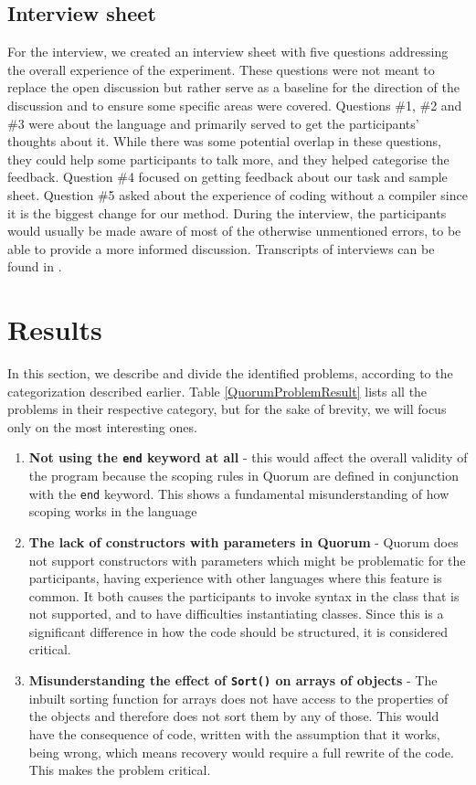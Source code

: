 \documentclass[preprint,10pt]{sigplanconf}
\begin{document}
\subsection{Interview sheet}
For the interview, we created an interview sheet with five questions addressing the overall experience of the experiment.
These questions were not meant to replace the open discussion but rather serve as a baseline for the direction of the discussion and to ensure some specific areas were covered.
Questions \#1, \#2 and \#3 were about the language and primarily served to get the participants' thoughts about it.
While there was some potential overlap in these questions, they could help some participants to talk more, and they helped categorise the feedback.
Question \#4 focused on getting feedback about our task and sample sheet.
Question \#5 asked about the experience of coding without a compiler since it is the biggest change for our method.
During the interview, the participants would usually be made aware of most of the otherwise unmentioned errors, to be able to provide a more informed discussion.
Transcripts of interviews can be found in \cite{thesis}.

\section{Results}
In this section, we describe and divide the identified problems, according to the categorization described earlier. Table \ref{QuorumProblemResult} lists all the problems in their respective category, but for the sake of brevity, we will focus only on the most interesting ones. 

\begin{enumerate}
\item \textbf{Not using the \lstinline!end! keyword at all} - this would affect the overall validity of the program because the scoping rules in Quorum are defined in conjunction with the \lstinline!end! keyword. This shows a fundamental misunderstanding of how scoping works in the language
\item \textbf{The lack of constructors with parameters in Quorum} - Quorum does not support constructors with parameters which might be problematic for the participants, having experience with other languages where this feature is common. It both causes the participants to invoke syntax in the class that is not supported, and to have difficulties instantiating classes. Since this is a significant difference in how the code should be structured, it is considered critical.
\item \textbf{Misunderstanding the effect of \lstinline!Sort()! on arrays of objects} - The inbuilt sorting function for arrays does not have access to the properties of the objects and therefore does not sort them by any of those. This would have the consequence of code, written with the assumption that it works, being wrong, which means recovery would require a full rewrite of the code. This makes the problem critical. 
\end{enumerate}
\end{document}
